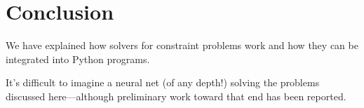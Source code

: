 \section{Conclusion} \label{sec:conclusion}

We have explained how solvers for constraint problems work and how they can be integrated into Python programs. 

It's difficult to imagine a neural net (of any depth!) solving the problems discussed here---although preliminary work toward that end has been reported. \cite{xu2018towards, amel2019shallow, dubois2019towards}


